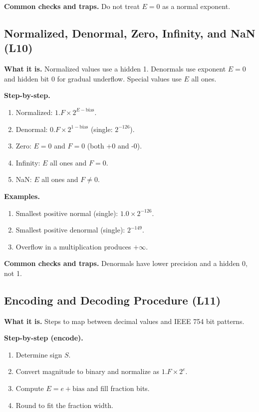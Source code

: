 \documentclass[11pt]{article}
\begin{document}
\textbf{Common checks and traps.} Do not treat $E=0$ as a normal exponent.

\subsection{Normalized, Denormal, Zero, Infinity, and NaN (L10)}
\textbf{What it is.} Normalized values use a hidden 1. Denormals use exponent $E=0$ and hidden bit 0 for gradual underflow. Special values use $E$ all ones.

\textbf{Step-by-step.}
\begin{enumerate}[leftmargin=*]
  \item Normalized: $1.F \times 2^{E-\text{bias}}$.
  \item Denormal: $0.F \times 2^{1-\text{bias}}$ (single: $2^{-126}$).
  \item Zero: $E=0$ and $F=0$ (both +0 and -0).
  \item Infinity: $E$ all ones and $F=0$.
  \item NaN: $E$ all ones and $F \ne 0$.
\end{enumerate}

\textbf{Examples.}
\begin{enumerate}[leftmargin=*]
  \item Smallest positive normal (single): $1.0 \times 2^{-126}$.
  \item Smallest positive denormal (single): $2^{-149}$.
  \item Overflow in a multiplication produces $+\infty$.
\end{enumerate}

\textbf{Common checks and traps.} Denormals have lower precision and a hidden 0, not 1.

\begin{figure}[h]
\centering
{}
\end{figure}

\subsection{Encoding and Decoding Procedure (L11)}
\textbf{What it is.} Steps to map between decimal values and IEEE 754 bit patterns.

\textbf{Step-by-step (encode).}
\begin{enumerate}[leftmargin=*]
  \item Determine sign $S$.
  \item Convert magnitude to binary and normalize as $1.F \times 2^e$.
  \item Compute $E=e+\text{bias}$ and fill fraction bits.
  \item Round to fit the fraction width.
\end{enumerate}
\end{document}
